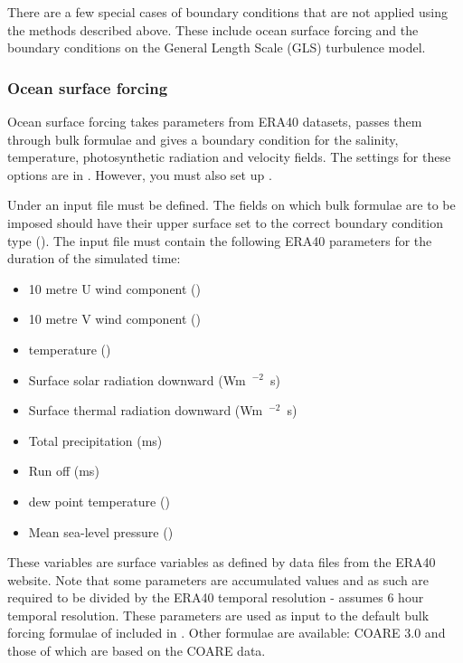 There are a few special cases of boundary conditions that are not applied
using the methods described above.  These include ocean surface forcing and
the boundary conditions on the General Length Scale (GLS) turbulence model.

\subsubsection{Ocean surface forcing}\label{sec:BCs:special:oceans}

Ocean surface forcing takes parameters from ERA40 datasets, passes them
through bulk formulae and gives a boundary condition for the salinity,
temperature, photosynthetic radiation and velocity fields. The settings for
these options are in . However, you must also set up
.

Under  an input file must be defined. The fields on
which bulk formulae are to be imposed should have their upper surface set to the correct
boundary condition type ().
The input file must contain the following ERA40 parameters for the
duration of the simulated time:
\begin{itemize}
 \item 10 metre U wind component (\ms)
 \item 10 metre V wind component (\ms)
 \item \m[2] temperature (\K)
 \item Surface solar radiation downward (\unit{Wm\ensuremath{^{-2}}s})
 \item Surface thermal radiation downward (\unit{Wm\ensuremath{^{-2}}s})
 \item Total precipitation (\unit{ms})
 \item Run off (\unit{ms})
 \item \m[2] dew point temperature (\K)
 \item Mean sea-level pressure (\Pa)
\end{itemize}

These variables are surface variables as defined by data files from the ERA40 website. Note that some parameters are accumulated values
and as such are required to be divided by the ERA40 temporal resolution - \fluidity { } assumes 6 hour temporal resolution.
These parameters are used as input to the default bulk forcing formulae of \citet{large2004} included in \fluidity. Other
formulae are available: COARE 3.0 \citep{fairall2003} and those of \citet{kara2005} which are based on the COARE data.


